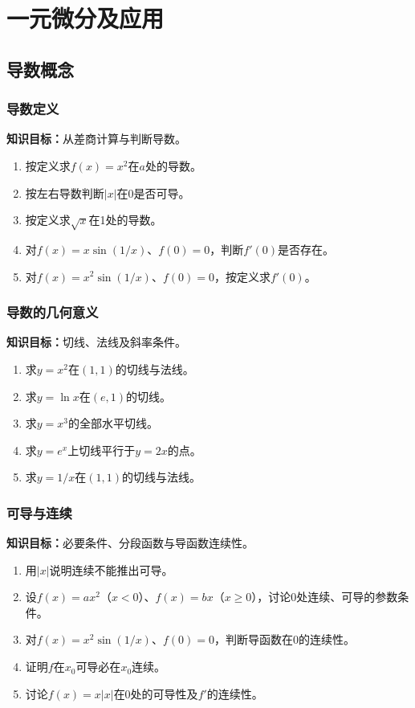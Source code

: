 \documentclass[11pt,a4paper,fontset=fandol]{ctexrep}
\newcommand{\goal}[1]{\textbf{知识目标：}#1\par}
\begin{document}
\chapter{一元微分及应用}
\section{导数概念}
\subsection{导数定义}
\goal{从差商计算与判断导数。}
\begin{enumerate}
\item 按定义求$f(x)=x^2$在$a$处的导数。
\item 按左右导数判断$|x|$在0是否可导。
\item 按定义求$\sqrt x$在1处的导数。
\item 对$f(x)=x\sin(1/x)$、$f(0)=0$，判断$f'(0)$是否存在。
\item 对$f(x)=x^2\sin(1/x)$、$f(0)=0$，按定义求$f'(0)$。
\end{enumerate}
\subsection{导数的几何意义}
\goal{切线、法线及斜率条件。}
\begin{enumerate}
\item 求$y=x^2$在$(1,1)$的切线与法线。
\item 求$y=\ln x$在$(e,1)$的切线。
\item 求$y=x^3$的全部水平切线。
\item 求$y=e^x$上切线平行于$y=2x$的点。
\item 求$y=1/x$在$(1,1)$的切线与法线。
\end{enumerate}
\subsection{可导与连续}
\goal{必要条件、分段函数与导函数连续性。}
\begin{enumerate}
\item 用$|x|$说明连续不能推出可导。
\item 设$f(x)=ax^2$（$x<0$）、$f(x)=bx$（$x\ge0$），讨论0处连续、可导的参数条件。
\item 对$f(x)=x^2\sin(1/x)$、$f(0)=0$，判断导函数在0的连续性。
\item 证明$f$在$x_0$可导必在$x_0$连续。
\item 讨论$f(x)=x|x|$在0处的可导性及$f'$的连续性。
\end{enumerate}
\end{document}
